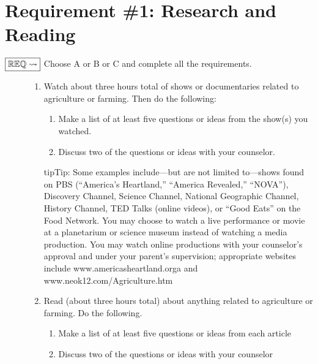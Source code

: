 \documentclass[letterpaper,10pt,english,openany,oneside]{sphinxmanual}
\begin{document}
\chapter{Requirement \#1: Research and Reading}
\label{\detokenize{requirement1:requirement-1-research-and-reading}}\label{\detokenize{requirement1::doc}}\begin{description}
\item[{\(\boxed{\mathbb{REQ}\Large \rightsquigarrow}\) Choose A or B or C and complete all the requirements.}] \leavevmode\begin{enumerate}
%
\item {} 
Watch about three hours total of shows or documentaries related to agriculture or farming. Then do the following:
\begin{enumerate}
%
\item {} 
Make a list of at least five questions or ideas from the show(s) you watched.

\item {} 
Discuss two of the questions or ideas with your counselor.

\end{enumerate}

\begin{sphinxadmonition}{tip}{Tip:}
Some examples include—but are not limited to—shows found on PBS (“America’s Heartland,” “America Revealed,” “NOVA”), Discovery Channel, Science Channel, National Geographic Channel, History Channel, TED Talks (online videos), or “Good Eats” on the Food Network. You may choose to watch a live performance or movie at a planetarium or science museum instead of watching a media production. You may watch online productions with your counselor’s approval and under your parent’s supervision; appropriate websites include www.americasheartland.orga and www.neok12.com/Agriculture.htm
\end{sphinxadmonition}

\item {} 
Read (about three hours total) about anything related to agriculture or farming. Do the following.
\begin{enumerate}
%
\item {} 
Make a list of at least five questions or ideas from each article

\item {} 
Discuss two of the questions or ideas with your counselor


\end{enumerate}
\end{enumerate}
\end{description}
\end{document}
